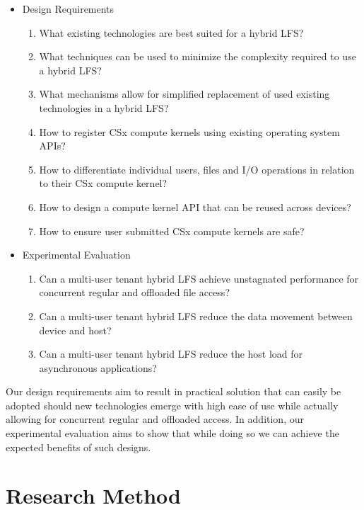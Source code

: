 \begin{itemize}
    \item Design Requirements
    \begin{enumerate}
        \item What existing technologies are best suited for a hybrid LFS?
        \item What techniques can be used to minimize the complexity required to
              use a hybrid LFS?
        \item What mechanisms allow for simplified replacement of used existing
              technologies in a hybrid LFS?
        \item How to register CSx compute kernels using existing operating 
              system APIs?
        \item How to differentiate individual users, files and I/O operations in
              relation to their CSx compute kernel?
        \item How to design a compute kernel API that can be reused across
              devices?
        \item How to ensure user submitted CSx compute kernels are safe?
    \end{enumerate}
    \item Experimental Evaluation
    \begin{enumerate}
        \item Can a multi-user tenant hybrid LFS achieve unstagnated performance
              for concurrent regular and offloaded file access?
        \item Can a multi-user tenant hybrid LFS reduce the data movement
              between device and host?
        \item Can a multi-user tenant hybrid LFS reduce the host load for
              asynchronous applications?
    \end{enumerate}
\end{itemize}

Our design requirements aim to result in practical solution that can easily be
adopted should new technologies emerge with high ease of use while actually
allowing for concurrent regular and offloaded access. In addition, our
experimental evaluation aims to show that while doing so we can achieve the
expected benefits of such designs.

\section{Research Method}


